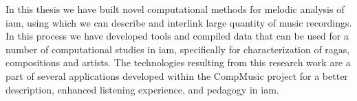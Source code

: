 In this thesis we have built novel computational methods for melodic analysis of iam, using which  we can describe and interlink large quantity of music recordings. In this process we have developed tools and compiled data that can be used for a number of computational studies in \gls{iam}, specifically for characterization of ragas, compositions and artists. The technologies resulting from this research work are a part of several applications developed within the CompMusic project for a better description, enhanced listening experience, and pedagogy in \gls{iam}.

%
%
%
%
%
%
%
%
%


